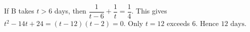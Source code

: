 If B takes $t>6$ days, then $\dfrac{1}{t-6}+\dfrac{1}{t}=\dfrac{1}{4}$. This gives $t^2-14t+24=(t-12)(t-2)=0$. Only $t=12$ exceeds 6. Hence $\boxed{12\text{ days}}$.
